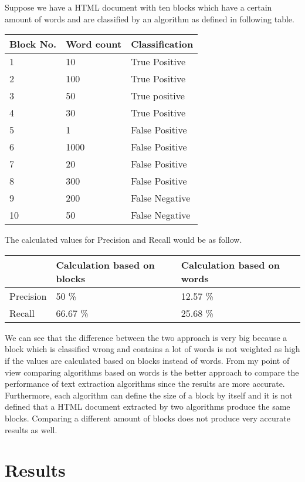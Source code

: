 Suppose we have a HTML document with ten blocks which have a certain amount of words and are classified by an algorithm as defined in following table.

\begin{tabular}{| p{3cm} | p{5cm} | p{5cm} | }
    \hline
    \textbf{Block No.}      & \textbf{Word count}  & \textbf{Classification} 				\\ \hline
    1     & 10      	&  True Positive	\\ \hline
    2     & 100     	&  True Positive	\\ \hline
    3     & 50       	&  True positive	\\ \hline
    4     & 30       	&  True Positive	\\ \hline
    5     & 1       	&  False Positive	\\ \hline
    6     & 1000      	&  False Positive	\\ \hline
    7     & 20      	&  False Positive	\\ \hline
    8     & 300       	&  False Positive	\\ \hline
    9     & 200       	&  False Negative	\\ \hline
    10    & 50        	&  False Negative	\\ \hline
\end{tabular}

The calculated values for Precision and Recall would be as follow.

\begin{tabular}{| p{3cm} | p{5cm} | p{5cm} | }
    \hline
    \     & \textbf{Calculation based on blocks}  & \textbf{Calculation based on words} 				\\ \hline
    Precision     & 50 \%    	&  12.57 \%	\\ \hline
    Recall & 66.67 \%    	&  25.68 \%	\\ \hline
\end{tabular}

We can see that the difference between the two approach is very big because a block which is classified wrong and contains a lot of words is not weighted as high if the values are calculated based on blocks instead of words. 
From my point of view comparing algorithms based on words is the better approach to compare the performance of text extraction algorithms since the results are more accurate. Furthermore, each algorithm can define the size of a block by itself and it is not defined that a HTML document extracted by two algorithms produce the same blocks. Comparing a different amount of blocks does not produce very accurate results as well.  



\section{Results}